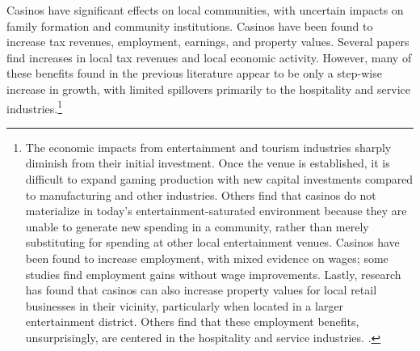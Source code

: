 \documentclass[12pt]{article}
\begin{document}
Casinos have significant effects on local communities, with uncertain impacts on family formation and community institutions. Casinos have been found to increase tax revenues, employment, earnings, and property values. Several papers find increases in local tax revenues and local economic activity. \parencite{humphreys2013new,wiley2011casino} However, many of these benefits found in the previous literature appear to be only a step-wise increase in growth, with limited spillovers primarily to the hospitality and service industries.\footnote{The economic impacts from entertainment and tourism industries sharply diminish from their initial investment. Once the venue is established, it is difficult to expand gaming production with new capital investments compared to manufacturing and other industries. Others find that casinos do not materialize in today's entertainment-saturated environment because they are unable to generate new spending in a community, rather than merely substituting for spending at other local entertainment venues. \parencite{Scavette2022Casinos,Krutz2022Casinos} Casinos have been found to increase employment, with mixed evidence on wages; some studies find employment gains without wage improvements. \parencite{cotti2008effect} Lastly, research has found that casinos can also increase property values for local retail businesses in their vicinity, particularly when located in a larger entertainment district. \parencite{wiley2011casino} Others find that these employment benefits, unsurprisingly, are centered in the hospitality and service industries. \parencite{humphreys2013new}.}
\end{document}
